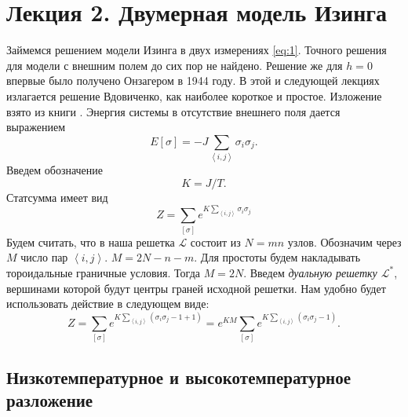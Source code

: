 \documentclass[a4paper,12pt]{article}
\theoremstyle{definition}
\theoremstyle{definition}
\theoremstyle{definition}
\begin{document}
\section{Лекция 2. Двумерная модель Изинга}
\label{sec:lecture-5}

Займемся решением модели Изинга в двух измерениях \eqref{eq:1}. Точного решения для модели с внешним полем до сих пор не найдено. Решение же для $h=0$ впервые было получено Онзагером в 1944 году. В этой и следующей лекциях излагается решение Вдовиченко, как наиболее короткое и простое. Изложение взято из книги \cite{belavin2001lect}.
Энергия системы в отсутствие внешнего поля дается выражением
\begin{equation}
  \label{eq:98}
  E[\sigma]=-J\sum_{\left<i,j\right>}\sigma_i \sigma_j .
\end{equation}
Введем обозначение
\begin{equation}
  \label{eq:99}
  K=J/T.
\end{equation}
Статсумма имеет вид
\begin{equation}
  \label{eq:100}
  Z=\sum_{[\sigma]}e^{K\sum_{\left<i,j\right>}\sigma_i\sigma_j}
\end{equation}
Будем считать, что в наша решетка $\mathcal{L}$ состоит из $N=mn$ узлов. Обозначим через $M$ число пар $\left<i,j\right>$. $M=2N-n-m$. Для простоты будем накладывать тороидальные граничные условия. Тогда $M=2N$. Введем {\it дуальную решетку $\mathcal{L}^*$}, вершинами которой будут центры граней исходной решетки. 
Нам удобно будет использовать действие в следующем виде:
\begin{equation}
  \label{eq:101}
  Z=\sum_{[\sigma]}e^{K\sum_{\left<i,j\right>}(\sigma_i\sigma_j-1+1)}=e^{KM} \sum_{[\sigma]}e^{K\sum_{\left<i,j\right>}(\sigma_i\sigma_j-1)}.
\end{equation}

\subsection{Низкотемпературное и высокотемпературное разложение}
\label{sec:low-high-temp}
\end{document}
